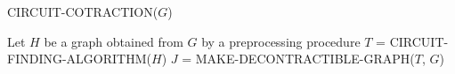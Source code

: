 \begin{algorithm}[H]
    \caption{CIRCUIT-COTRACTION($G$)}\label{alg:circuit-contraction}
    \begin{algorithmic}[1]
        \State Let $H$ be a graph obtained from $G$ by a preprocessing procedure
        \State $T$ = CIRCUIT-FINDING-ALGORITHM($H$)
        \State $J$ = MAKE-DECONTRACTIBLE-GRAPH($T$, $G$)
    \end{algorithmic}
\end{algorithm}